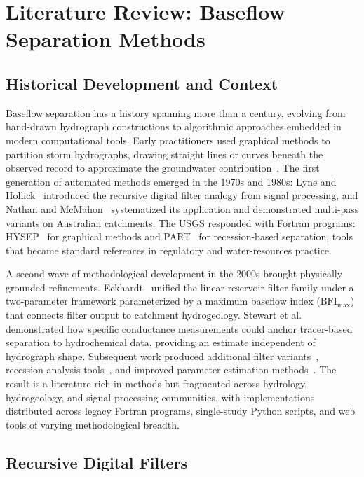 \documentclass[hydrology,article,submit,pdftex,moreauthors]{Definitions/mdpi}
\begin{document}
\section{Literature Review: Baseflow Separation Methods}
\label{sec:litreview}

\subsection{Historical Development and Context}
\label{sec:history}

Baseflow separation has a history spanning more than a century, evolving from hand-drawn hydrograph constructions to algorithmic approaches embedded in modern computational tools. Early practitioners used graphical methods to partition storm hydrographs, drawing straight lines or curves beneath the observed record to approximate the groundwater contribution~\cite{Barnes1939}. The first generation of automated methods emerged in the 1970s and 1980s: Lyne and Hollick~\cite{Lyne1979} introduced the recursive digital filter analogy from signal processing, and Nathan and McMahon~\cite{Nathan1990} systematized its application and demonstrated multi-pass variants on Australian catchments. The USGS responded with Fortran programs: HYSEP~\cite{Sloto1996} for graphical methods and PART~\cite{Rutledge1998} for recession-based separation, tools that became standard references in regulatory and water-resources practice.

A second wave of methodological development in the 2000s brought physically grounded refinements. Eckhardt~\cite{Eckhardt2005} unified the linear-reservoir filter family under a two-parameter framework parameterized by a maximum baseflow index ($\mathrm{BFI_{max}}$) that connects filter output to catchment hydrogeology. Stewart et al.~\cite{Stewart2007} demonstrated how specific conductance measurements could anchor tracer-based separation to hydrochemical data, providing an estimate independent of hydrograph shape. Subsequent work produced additional filter variants~\cite{Willems2009,Jakeman1993}, recession analysis tools~\cite{Arnold1999,Cheng2016}, and improved parameter estimation methods~\cite{Collischonn2013}. The result is a literature rich in methods but fragmented across hydrology, hydrogeology, and signal-processing communities, with implementations distributed across legacy Fortran programs, single-study Python scripts, and web tools of varying methodological breadth.

\subsection{Recursive Digital Filters}
\label{sec:generalized_filter}
\end{document}

